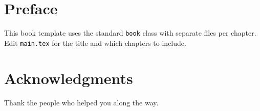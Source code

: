 \maketitle

\tableofcontents

\chapter*{Preface}
This book template uses the standard \texttt{book} class with separate files per chapter.
Edit \texttt{main.tex} for the title and which chapters to include.

\chapter*{Acknowledgments}
Thank the people who helped you along the way.
